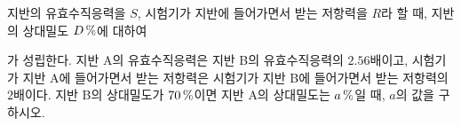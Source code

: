 지반의 유효수직응력을 $S$, 시험기가 지반에 들어가면서 받는 저항력을 $R$라 할 때, 지반의 상대밀도 $D\mkern3mu \%$에 대하여 \par\smallskip{}\par\smallskip\noindent 가 성립한다. 지반 A의 유효수직응력은 지반 B의 유효수직응력의 $2.56$배이고, 시험기가 지반 A에 들어가면서 받는 저항력은 시험기가 지반 B에 들어가면서 받는 저항력의 $2$배이다. 지반 B의 상대밀도가 $70\mkern3mu \%$이면 지반 A의 상대밀도는 $a\mkern3mu \%$일 때, $a$의 값을 구하시오. 
